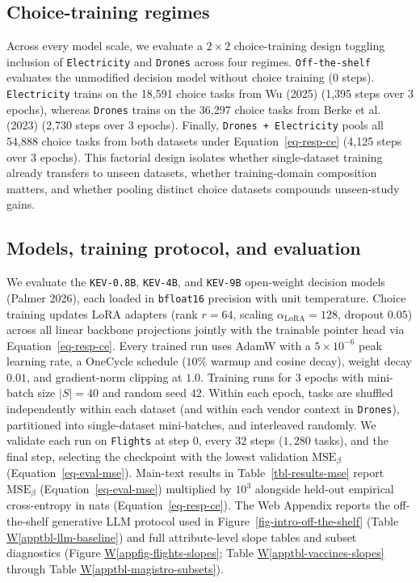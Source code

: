 \documentclass[
  11pt,
  letterpaper,
]{article}
\newcommand*\quartoapptblref[1]{Table \hyperref[#1]{W\ref{#1}}}
\newcommand*\quartoappfigref[1]{Figure \hyperref[#1]{W\ref{#1}}}
\begin{document}
\subsection{Choice-training regimes}\label{choice-training-regimes}

Across every model scale, we evaluate a \(2 \times 2\) choice-training
design toggling inclusion of \texttt{Electricity} and \texttt{Drones}
across four regimes. \texttt{Off-the-shelf} evaluates the unmodified
decision model without choice training (\(0\) steps).
\texttt{Electricity} trains on the 18,591 choice tasks from Wu (2025)
(1,395 steps over \(3\) epochs), whereas \texttt{Drones} trains on the
36,297 choice tasks from Berke et al. (2023) (2,730 steps over \(3\)
epochs). Finally, \texttt{Drones\ +\ Electricity} pools all 54,888
choice tasks from both datasets under Equation~\ref{eq-resp-ce} (4,125
steps over \(3\) epochs). This factorial design isolates whether
single-dataset training already transfers to unseen datasets, whether
training-domain composition matters, and whether pooling distinct choice
datasets compounds unseen-study gains.

\subsection{Models, training protocol, and
evaluation}\label{models-training-protocol-and-evaluation}

We evaluate the \texttt{KEV-0.8B}, \texttt{KEV-4B}, and \texttt{KEV-9B}
open-weight decision models (Palmer 2026), each loaded in
\texttt{bfloat16} precision with unit temperature. Choice training
updates LoRA adapters (rank \(r = 64\), scaling
\(\alpha_{\mathrm{LoRA}} = 128\), dropout \(0.05\)) across all linear
backbone projections jointly with the trainable pointer head via
Equation~\ref{eq-resp-ce}. Every trained run uses AdamW with a
\(5 \times 10^{-6}\) peak learning rate, a OneCycle schedule (\(10\%\)
warmup and cosine decay), weight decay \(0.01\), and gradient-norm
clipping at \(1.0\). Training runs for \(3\) epochs with mini-batch size
\(|S| = 40\) and random seed \(42\). Within each epoch, tasks are
shuffled independently within each dataset (and within each vendor
context in \texttt{Drones}), partitioned into single-dataset
mini-batches, and interleaved randomly. We validate each run on
\texttt{Flights} at step \(0\), every \(32\) steps (\(1,280\) tasks),
and the final step, selecting the checkpoint with the lowest validation
\(\mathrm{MSE}_\beta\) (Equation~\ref{eq-eval-mse}). Main-text results
in Table~\ref{tbl-results-mse} report \(\mathrm{MSE}_\beta\)
(Equation~\ref{eq-eval-mse}) multiplied by \(10^3\) alongside held-out
empirical cross-entropy in nats (Equation~\ref{eq-resp-ce}). The Web
Appendix reports the off-the-shelf generative LLM protocol used in
Figure~\ref{fig-intro-off-the-shelf}
(\quartoapptblref{apptbl-llm-baseline}) and full attribute-level slope
tables and subset diagnostics (\quartoappfigref{appfig-flights-slopes};
\quartoapptblref{apptbl-vaccines-slopes} through
\quartoapptblref{apptbl-magistro-subsets}).
\end{document}
